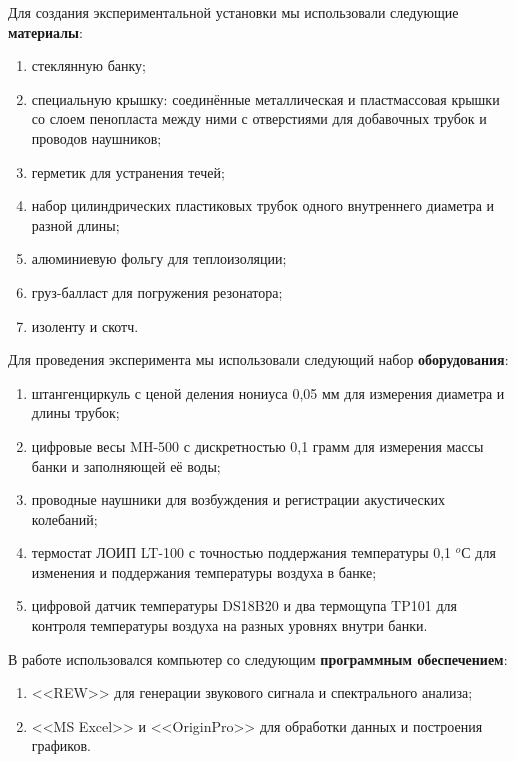 \documentclass[12pt]{extreport}
\begin{document}
	\hspace{4mm} Для создания экспериментальной установки мы использовали следующие \textbf{материалы}:
	\begin{enumerate}
		\item стеклянную банку;
		\item специальную крышку: соединённые металлическая и пластмассовая крышки со слоем пенопласта между ними с отверстиями для добавочных трубок и проводов наушников;
		\item герметик для устранения течей;
		\item набор цилиндрических пластиковых трубок одного внутреннего диаметра и разной длины;
		\item алюминиевую фольгу для теплоизоляции;
		\item груз-балласт для погружения резонатора;
		\item изоленту и скотч.
	\end{enumerate}
	
	Для проведения эксперимента мы использовали следующий набор \textbf{оборудования}:
	\begin{enumerate}
		\item штангенциркуль с ценой деления нониуса 0,05 мм для измерения диаметра и длины трубок;
		\item цифровые весы MH-500 с дискретностью 0,1 грамм для измерения массы банки и заполняющей её воды;
		\item проводные наушники для возбуждения и регистрации акустических колебаний;
		\item термостат ЛОИП LT-100 с точностью поддержания температуры 0,1 $^oС$ для изменения и поддержания температуры воздуха в банке;
		\item цифровой датчик температуры DS18B20 и два термощупа TP101 для контроля температуры воздуха на разных уровнях внутри банки.
	\end{enumerate}		
	
	В работе использовался компьютер со следующим \textbf{программным обеспечением}:
	
	\begin{enumerate}
		
		\item <<REW>> для генерации звукового сигнала и спектрального анализа;
		\item <<MS Excel>> и <<OriginPro>> для обработки данных и построения графиков.
	\end{enumerate}	
	
	
	
\end{document}
